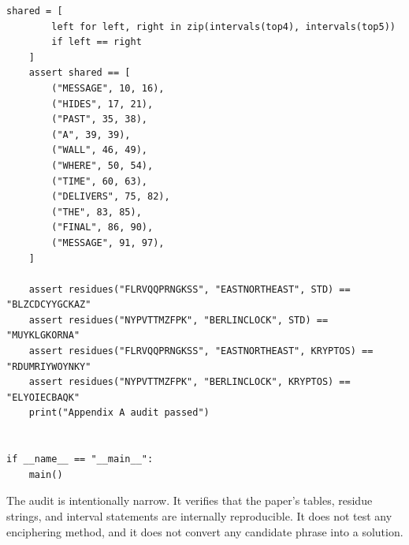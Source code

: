 \documentclass[12pt]{paperFormatting}
\begin{document}
\begin{thesisbody}
\begin{theappendices}
\begin{lstlisting}[style=paperPython,caption={Python audit for Appendix A reproducibility checks.},label={code:appendixAuditScript}]
    shared = [
        left for left, right in zip(intervals(top4), intervals(top5))
        if left == right
    ]
    assert shared == [
        ("MESSAGE", 10, 16),
        ("HIDES", 17, 21),
        ("PAST", 35, 38),
        ("A", 39, 39),
        ("WALL", 46, 49),
        ("WHERE", 50, 54),
        ("TIME", 60, 63),
        ("DELIVERS", 75, 82),
        ("THE", 83, 85),
        ("FINAL", 86, 90),
        ("MESSAGE", 91, 97),
    ]

    assert residues("FLRVQQPRNGKSS", "EASTNORTHEAST", STD) == "BLZCDCYYGCKAZ"
    assert residues("NYPVTTMZFPK", "BERLINCLOCK", STD) == "MUYKLGKORNA"
    assert residues("FLRVQQPRNGKSS", "EASTNORTHEAST", KRYPTOS) == "RDUMRIYWOYNKY"
    assert residues("NYPVTTMZFPK", "BERLINCLOCK", KRYPTOS) == "ELYOIECBAQK"
    print("Appendix A audit passed")


if __name__ == "__main__":
    main()
\end{lstlisting}

The audit is intentionally narrow. It verifies that the paper's tables, residue strings, and interval statements are internally reproducible. It does not test any enciphering method, and it does not convert any candidate phrase into a solution.
\end{theappendices}

\buildBibliography
\end{thesisbody}
\end{document}
